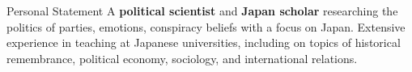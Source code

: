 \begin{rubric}{Personal Statement}
\entry*[]A \textbf{political scientist} and \textbf{Japan scholar} researching the politics of parties, emotions, conspiracy beliefs with a focus on Japan. Extensive experience in teaching at Japanese universities, including on topics of historical remembrance, political economy, sociology, and international relations. 
\end{rubric}